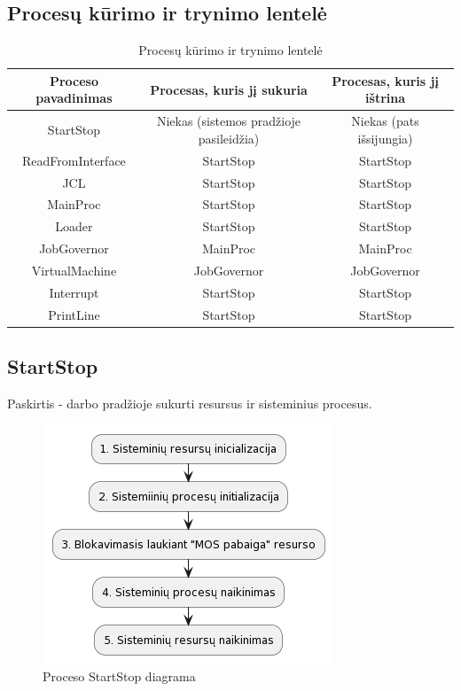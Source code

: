 \documentclass{VUMIFInfKursinis}
\begin{document}
\subsection{Procesų kūrimo ir trynimo lentelė}

\begin{table}[H]\footnotesize
	\centering
	\caption{Procesų kūrimo ir trynimo lentelė}    %
	\begin{tabular}{|c|c|c|}
		\hline
		Proceso pavadinimas & Procesas, kuris jį sukuria & Procesas, kuris jį ištrina \\
		\hline
		StartStop & Niekas (sistemos pradžioje pasileidžia) & Niekas (pats išsijungia) \\
		\hline
		ReadFromInterface & StartStop & StartStop\\
		\hline
		JCL & StartStop & StartStop \\
		\hline
		MainProc & StartStop & StartStop \\
		\hline
		Loader & StartStop & StartStop \\
		\hline
		JobGovernor & MainProc & MainProc \\
		\hline
		VirtualMachine & JobGovernor & JobGovernor \\
		\hline
		Interrupt & StartStop & StartStop \\
		\hline
		PrintLine & StartStop & StartStop \\
		\hline
	\end{tabular}
	\label{tab:duomenys}
\end{table}

\subsection{StartStop}

Paskirtis - darbo pradžioje sukurti resursus ir sisteminius procesus.

\begin{figure}[H]
	\centering	
	\includegraphics[scale=0.65]{img/StartStop}
	\caption{Proceso StartStop diagrama}   %
	\label{img:StartStop}
\end{figure}
\end{document}
